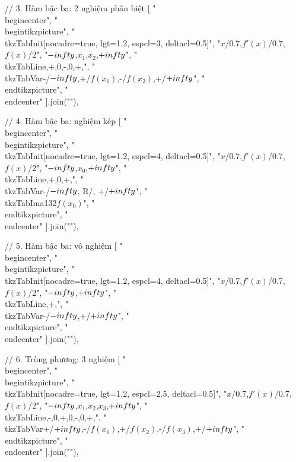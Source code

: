 // 3. Hàm bậc ba: 2 nghiệm phân biệt
[
"\\begin{center}",
"\\begin{tikzpicture}",
"\\tkzTabInit[nocadre=true, lgt=1.2, espcl=3, deltacl=0.5]",
"{$x$/0.7,$f'(x)$/0.7,$f(x)$/2}",
"{$-\\infty$,$x_1$,$x_2$,$+\\infty$}",
"\\tkzTabLine{,+,0,-,0,+,}",
"\\tkzTabVar{-/$-\\infty$,+/$f(x_1)$,-/$f(x_2)$,+/$+\\infty$}",
"\\end{tikzpicture}",
"\\end{center}"
].join("\n"),

// 4. Hàm bậc ba: nghiệm kép
[
"\\begin{center}",
"\\begin{tikzpicture}",
"\\tkzTabInit[nocadre=true, lgt=1.2, espcl=4, deltacl=0.5]",
"{$x$/0.7,$f'(x)$/0.7,$f(x)$/2}",
"{$-\\infty$,$x_0$,$+\\infty$}",
"\\tkzTabLine{,+,0,+,}",
"\\tkzTabVar{-/$-\\infty$, R/, +/$+\\infty$}",
"\\tkzTabIma{1}{3}{2}{$f(x_0)$}",
"\\end{tikzpicture}",
"\\end{center}"
].join("\n"),

// 5. Hàm bậc ba: vô nghiệm
[
"\\begin{center}",
"\\begin{tikzpicture}",
"\\tkzTabInit[nocadre=true, lgt=1.2, espcl=4, deltacl=0.5]",
"{$x$/0.7,$f'(x)$/0.7,$f(x)$/2}",
"{$-\\infty$,$+\\infty$}",
"\\tkzTabLine{,+,}",
"\\tkzTabVar{-/$-\\infty$,+/$+\\infty$}",
"\\end{tikzpicture}",
"\\end{center}"
].join("\n"),

// 6. Trùng phương: 3 nghiệm
[
"\\begin{center}",
"\\begin{tikzpicture}",
"\\tkzTabInit[nocadre=true, lgt=1.2, espcl=2.5, deltacl=0.5]",
"{$x$/0.7,$f'(x)$/0.7,$f(x)$/2}",
"{$-\\infty$,$x_1$,$x_2$,$x_3$,$+\\infty$}",
"\\tkzTabLine{,-,0,+,0,-,0,+,}",
"\\tkzTabVar{+/$+\\infty$,-/$f(x_1)$,+/$f(x_2)$,-/$f(x_3)$,+/$+\\infty$}",
"\\end{tikzpicture}",
"\\end{center}"
].join("\n"),


